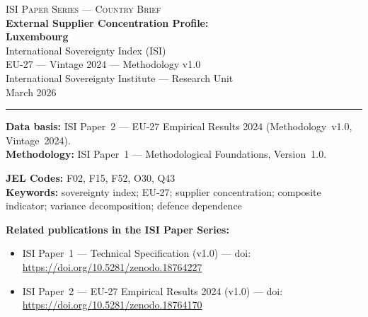 \documentclass[12pt,a4paper]{article}
\begin{document}
\hypersetup{pageanchor=false}

\begin{titlepage}
\centering
\vspace*{2cm}
{\Large\textsc{ISI Paper Series --- Country Brief}}\\[1.2cm]
{\LARGE\bfseries External Supplier Concentration Profile:\\[0.3em]
Luxembourg}\\[1.5cm]
{\large International Sovereignty Index (ISI)\\[0.3em]
EU-27 --- Vintage 2024 --- Methodology v1.0}\\[1.2cm]
{\large International Sovereignty Institute --- Research Unit}\\[0.8cm]
{\large March 2026}

\vspace{0.8cm}
\noindent\rule{\textwidth}{0.4pt}
\vspace{0.4cm}

\begin{flushleft}
\noindent\textbf{Data basis:} ISI Paper~2 --- EU-27 Empirical Results 2024 (Methodology~v1.0, Vintage~2024).\\[4pt]
\noindent\textbf{Methodology:} ISI Paper~1 --- Methodological Foundations, Version~1.0.

\medskip

\noindent\textbf{JEL Codes:} F02, F15, F52, O30, Q43\\[4pt]
\noindent\textbf{Keywords:} sovereignty index; EU-27; supplier concentration; composite indicator; variance decomposition; defence dependence

\medskip

\noindent\textbf{Related publications in the ISI Paper Series:}
\begin{itemize}[nosep,leftmargin=1.5em]
\item ISI Paper~1 --- Technical Specification (v1.0) --- doi:\\
  \url{https://doi.org/10.5281/zenodo.18764227}
\item ISI Paper~2 --- EU-27 Empirical Results 2024 (v1.0) --- doi:\\
  \url{https://doi.org/10.5281/zenodo.18764170}
\end{itemize}
\end{flushleft}
\vfill
\end{titlepage}
\end{document}

